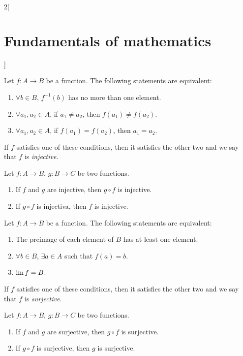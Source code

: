 \documentclass[../../../main.tex]{subfiles}
\begin{document}
\begin{multicols}{2}[\section{Fundamentals of mathematics}]
\begin{prop}
\begin{enumerate}
        \end{enumerate}
    \end{prop}
    \begin{definition}
        Let $f:A\rightarrow B$ be a function. The following statements are equivalent:
        \begin{enumerate}
            \item $\forall b\in B$, $f^{-1}(b)$ has no more than one element.
            \item $\forall a_1,a_2\in A$, if $a_1\ne a_2$, then $f(a_1)\ne f(a_2)$.
            \item $\forall a_1,a_2\in A$, if $f(a_1)= f(a_2)$, then $a_1=a_2$.
        \end{enumerate}
        If $f$ satisfies one of these conditions, then it satisfies the other two and we say that $f$ is \textit{injective}.
    \end{definition}
    \begin{prop}
        Let $f:A\rightarrow B$, $g:B\rightarrow C$ be two functions.
        \begin{enumerate}
            \item If $f$ and $g$ are injective, then $g\circ f$ is injective.
            \item If $g\circ f$ is injectiva, then $f$ is injective.
        \end{enumerate}
    \end{prop}
    \begin{definition}
        Let $f:A\rightarrow B$ be a function. The following statements are equivalent:
        \begin{enumerate}
            \item The preimage of each element of $B$ has at least one element.
            \item $\forall b\in B$, $\exists a\in A$ such that $f(a)=b$.
            \item $\operatorname{im} f=B$.
        \end{enumerate}
        If $f$ satisfies one of these conditions, then it satisfies the other two and we say that $f$ is \textit{surjective}.
    \end{definition}
    \begin{prop}
        Let $f:A\rightarrow B$, $g:B\rightarrow C$ be two functions.
        \begin{enumerate}
            \item If $f$ and $g$ are surjective, then $g\circ f$ is surjective.
            \item If $g\circ f$ is surjective, then $g$ is surjective.

\end{enumerate}
\end{prop}
\end{multicols}
\end{document}

